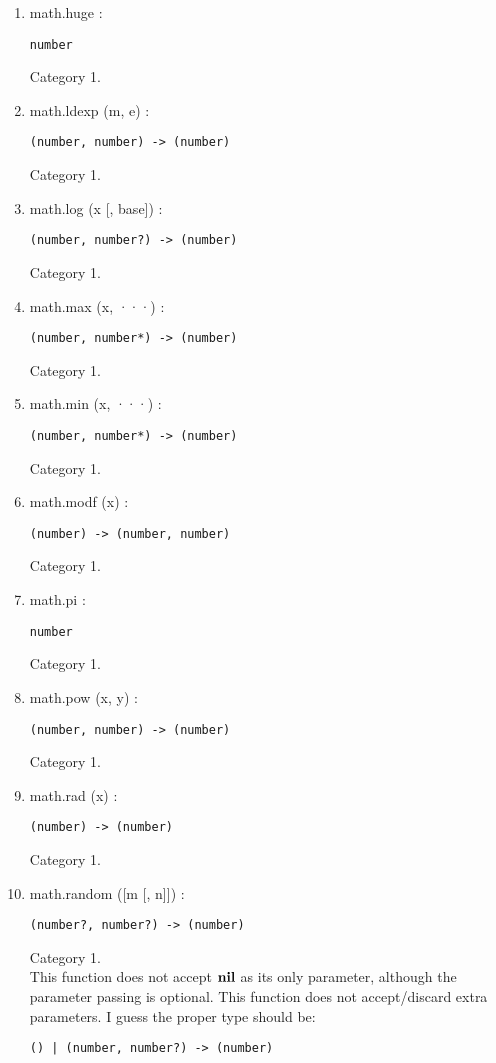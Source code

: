 \begin{enumerate}
\begin{verbatim}
(number) -> (number, number)
\end{verbatim}
Category 1.
\item math.huge :
\begin{verbatim}
number
\end{verbatim}
Category 1.
\item math.ldexp (m, e) :
\begin{verbatim}
(number, number) -> (number)
\end{verbatim}
Category 1.
\item math.log (x [, base]) :
\begin{verbatim}
(number, number?) -> (number)
\end{verbatim}
Category 1.
\item math.max (x, ···) :
\begin{verbatim}
(number, number*) -> (number)
\end{verbatim}
Category 1.
\item math.min (x, ···) :
\begin{verbatim}
(number, number*) -> (number)
\end{verbatim}
Category 1.
\item math.modf (x) :
\begin{verbatim}
(number) -> (number, number)
\end{verbatim}
Category 1.
\item math.pi :
\begin{verbatim}
number
\end{verbatim}
Category 1.
\item math.pow (x, y) :
\begin{verbatim}
(number, number) -> (number)
\end{verbatim}
Category 1.
\item math.rad (x) :
\begin{verbatim}
(number) -> (number)
\end{verbatim}
Category 1.
\item math.random ([m [, n]]) :
\begin{verbatim}
(number?, number?) -> (number)
\end{verbatim}
Category 1.
\\
This function does not accept $\mathbf{nil}$ as its only parameter,
although the parameter passing is optional.
This function does not accept/discard extra parameters.
I guess the proper type should be:
\begin{verbatim}
() | (number, number?) -> (number)

\end{verbatim}
\end{enumerate}
